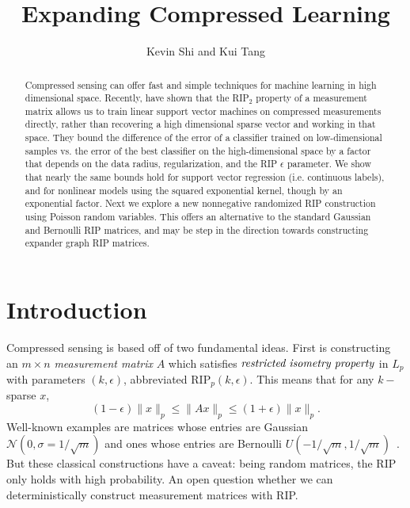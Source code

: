 \documentclass[english]{article}
\begin{document}
\title{Expanding Compressed Learning}

\author{Kevin Shi and Kui Tang}
\maketitle
\begin{abstract}
Compressed sensing can offer fast and simple techniques for machine learning in high dimensional space. Recently, \citet{Calderbank09} have shown that the RIP$_2$ property of a measurement matrix allows us to train linear support vector machines on compressed measurements directly, rather than recovering a high dimensional sparse vector and working in that space.
They bound the difference of the error of a classifier trained on low-dimensional samples vs. the error of the best classifier on the high-dimensional space by a factor that depends on the data radius, regularization, and the RIP $\epsilon$ parameter.
We show that nearly the same bounds hold for support vector regression (i.e. continuous labels), and for nonlinear models using the squared exponential kernel, though by an exponential factor.
Next we explore a new nonnegative randomized RIP construction using Poisson random variables.
This offers an alternative to the standard Gaussian and Bernoulli RIP matrices, and may be step in the direction towards constructing expander graph RIP matrices.
\end{abstract}

\section{Introduction}

Compressed sensing is based off of two fundamental ideas.
First is constructing an $m \times n$ \emph{measurement matrix} $A$ which satisfies $\emph{restricted isometry property}$ in $L_p$ with parameters $(k,\epsilon)$, abbreviated $\mbox{RIP}_p(k,\epsilon)$.
This means that for any $k-$sparse $x$, $$(1-\epsilon)\|x\|_p \le\|Ax\|_p \le (1+\epsilon)\|x\|_p.$$
Well-known examples are matrices whose entries are Gaussian $\mathcal{N}(0,\sigma=1/\sqrt{m})$ and ones whose entries are Bernoulli $U(-1/\sqrt{m},1/\sqrt{m})$~\citep{Baraniuk08}.
But these classical constructions have a caveat: being random matrices, the RIP only holds with high probability.
An open question whether we can deterministically construct measurement matrices with RIP.
\end{document}
